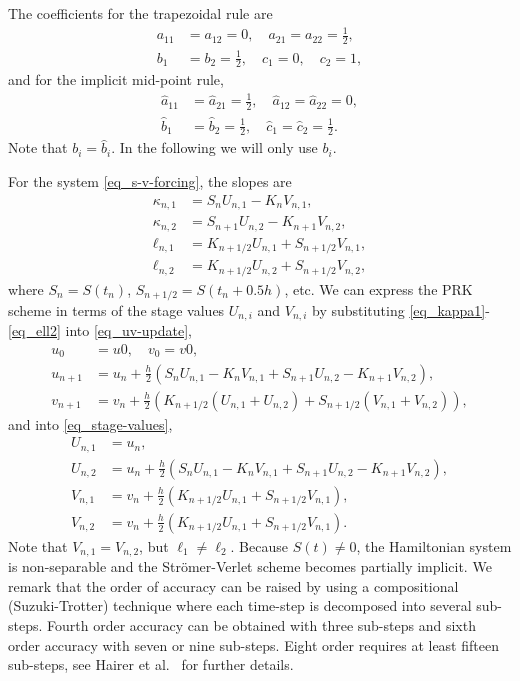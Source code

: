 \documentclass[11pt]{article}
\begin{document}
The coefficients for the trapezoidal rule are
\begin{align}
  a_{11} &= a_{12} = 0,\quad a_{21} = a_{22} = \frac{1}{2},\\
  b_{1} &= b_2 = \frac{1}{2},\quad  c_1 = 0,\quad c_2=1,
\end{align}
and for the implicit mid-point rule,
\begin{align}
  \hat{a}_{11} &= \hat{a}_{21} = \frac{1}{2},\quad \hat{a}_{12} = \hat{a}_{22} = 0,\\
  \hat{b}_{1} &= \hat{b}_2 = \frac{1}{2},\quad  \hat{c}_1 = \hat{c}_2=\frac{1}{2}.
\end{align}
Note that $b_i = \hat{b}_i$. In the following we will only use $b_i$.

For the system \eqref{eq_s-v-forcing}, the slopes are
\begin{align}
\kappa_{n,1} &= S_nU_{n,1} - K_nV_{n,1} ,\label{eq_kappa1}\\
\kappa_{n,2} &= S_{n+1}U_{n,2} - K_{n+1}V_{n,2},\\
\ell_{n,1} &= K_{n+1/2} U_{n,1} + S_{n+1/2} V_{n,1},\\
\ell_{n,2} &= K_{n+1/2} U_{n,2} + S_{n+1/2} V_{n,2},\label{eq_ell2}
\end{align}
where $S_n = S(t_{n})$, $S_{n+1/2} = S(t_n + 0.5 h)$, etc. We can express the PRK scheme in terms of
the stage values $U_{n,i}$ and $V_{n,i}$ by substituting \eqref{eq_kappa1}-\eqref{eq_ell2} into \eqref{eq_uv-update},
\begin{align}
  u_0 &= u0,\quad v_0 = v0,\label{eq_initial-cond}\\
  u_{n+1} &= u_n + \frac{h}{2}\left(S_nU_{n,1} - K_nV_{n,1} + S_{n+1}U_{n,2} - K_{n+1}V_{n,2}
  \right),\label{eq_u-update}\\
  v_{n+1} &= v_n + \frac{h}{2}\left(K_{n+1/2} \left(U_{n,1} + U_{n,2}\right) + S_{n+1/2}\left(
  V_{n,1} +  V_{n,2}\right) \right),\label{eq_v-update}
\end{align}
and into \eqref{eq_stage-values},
\begin{align} 
  U_{n,1} &= u_n,\label{eq_U1}\\
  U_{n,2} &= u_n + \frac{h}{2}\left(S_nU_{n,1} - K_nV_{n,1} + S_{n+1}U_{n,2} -
  K_{n+1}V_{n,2} \right),\\
  V_{n,1} &= v_n + \frac{h}{2}\left(  K_{n+1/2} U_{n,1} + S_{n+1/2} V_{n,1} \right),\\
  V_{n,2} &= v_n + \frac{h}{2}\left(  K_{n+1/2} U_{n,1} + S_{n+1/2} V_{n,1} \right).\label{eq_V2}
\end{align}
Note that $V_{n,1} = V_{n,2}$, but $\ell_1 \ne \ell_2$. Because $S(t)\ne0$, the Hamiltonian system
is non-separable and the Str\"omer-Verlet scheme becomes partially implicit. We remark that the order
of accuracy can be raised by using a compositional (Suzuki-Trotter) technique where each time-step
is decomposed into several sub-steps. Fourth order accuracy can be obtained with three sub-steps and
sixth order accuracy with seven or nine sub-steps. Eight order requires at least fifteen sub-steps, see
Hairer et al.~\cite{HairerLubichWanner-06} for further details.
\end{document}
